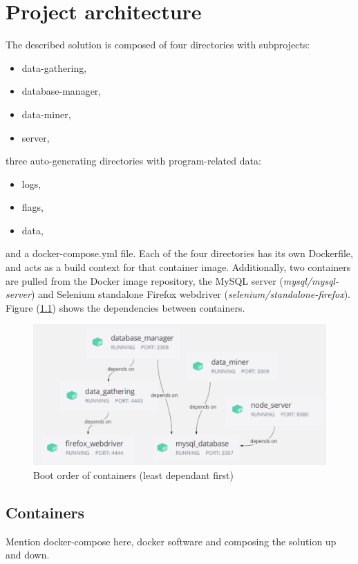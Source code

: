 \chapter{Project architecture}
\label{ch:architecture}
The described solution is composed of four directories with subprojects:
\begin{itemize}
\setlength\itemsep{0.2em}
\item data-gathering,
\item database-manager,
\item data-miner,
\item server,
\end{itemize}
three auto-generating directories with program-related data:
\begin{itemize}
\setlength\itemsep{0.2em}
\item logs,
\item flags,
\item data,
\end{itemize}
and a docker-compose.yml file. Each of the four directories has its own Dockerfile, and acts as a build context for that container image. Additionally, two containers are pulled from the Docker image repository, the MySQL server (\textit{mysql/mysql-server}) and Selenium standalone Firefox webdriver (\textit{selenium/standalone-firefox}).
Figure (\ref{arch:container_dependencies}) shows the dependencies between containers.

\begin{figure}[ht]
    \centering
    \includegraphics[width=\textwidth]{figures/container_dependencies.png}
    \caption{Boot order of containers (least dependant first)}
    \label{arch:container_dependencies}
\end{figure}

\section{Containers}
Mention docker-compose here, docker software and composing the solution up and down.

